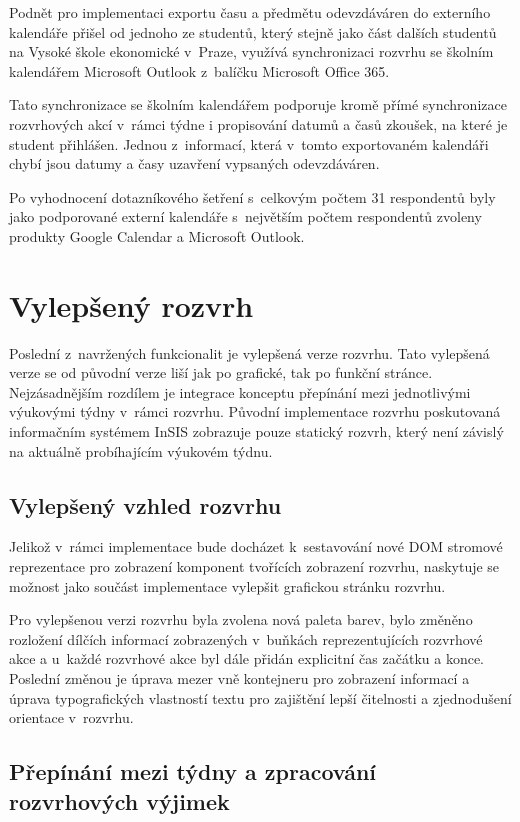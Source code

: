 Podnět pro implementaci exportu času a předmětu odevzdáváren do externího kalendáře přišel od jednoho ze studentů, který stejně jako část dalších studentů na Vysoké škole ekonomické v~Praze, využívá synchronizaci rozvrhu se školním kalendářem Microsoft Outlook z~balíčku Microsoft Office 365.

Tato synchronizace se školním kalendářem podporuje kromě přímé synchronizace rozvrhových akcí v~rámci týdne i propisování datumů a časů zkoušek, na které je student přihlášen. Jednou z~informací, která v~tomto exportovaném kalendáři chybí jsou datumy a časy uzavření vypsaných odevzdáváren.

Po vyhodnocení dotazníkového šetření s~celkovým počtem 31 respondentů byly jako podporované externí kalendáře s~největším počtem respondentů zvoleny produkty Google Calendar a Microsoft Outlook.

\section{Vylepšený rozvrh}\label{sec:vylepseny-rozvrh}

Poslední z~navržených funkcionalit je vylepšená verze rozvrhu. Tato vylepšená verze se od původní verze liší jak po grafické, tak po funkční stránce. Nejzásadnějším rozdílem je integrace konceptu přepínání mezi jednotlivými výukovými týdny v~rámci rozvrhu. Původní implementace rozvrhu poskutovaná informačním systémem InSIS zobrazuje pouze statický rozvrh, který není závislý na aktuálně probíhajícím výukovém týdnu.

\subsection{Vylepšený vzhled rozvrhu}

Jelikož v~rámci implementace bude docházet k~sestavování nové DOM stromové reprezentace pro zobrazení komponent tvořících zobrazení rozvrhu, naskytuje se možnost jako součást  implementace vylepšit grafickou stránku rozvrhu. 

Pro vylepšenou verzi rozvrhu byla zvolena nová paleta barev, bylo změněno rozložení dílčích informací zobrazených v~buňkách reprezentujících rozvrhové akce a u~každé rozvrhové akce byl dále přidán explicitní čas začátku a konce. Poslední změnou je úprava mezer vně kontejneru pro zobrazení informací a úprava typografických vlastností textu pro zajištění lepší čitelnosti a zjednodušení orientace v~rozvrhu.

\subsection{Přepínání mezi týdny a zpracování rozvrhových výjimek}

